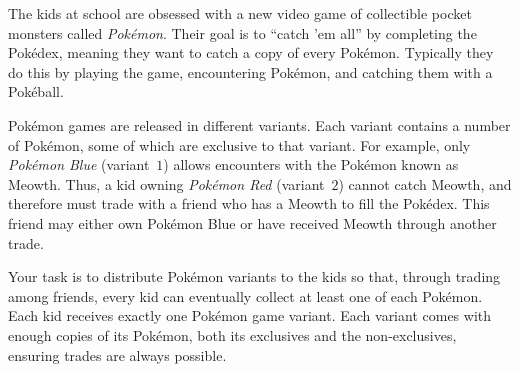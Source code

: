

The kids at school are obsessed with a new video game of collectible pocket monsters called \emph{Pokémon}.
Their goal is to ``catch 'em all'' by completing the Pokédex, meaning they want to catch a copy of every Pokémon.
Typically they do this by playing the game, encountering Pokémon, and catching them with a Pokéball.

Pokémon games are released in different variants.
Each variant contains a number of Pokémon, some of which are exclusive to that variant.
For example, only \emph{Pokémon Blue} (variant~$1$) allows encounters with the Pokémon known as Meowth.
Thus, a kid owning \emph{Pokémon Red} (variant~$2$) cannot catch Meowth, and therefore must trade with a friend who has a Meowth to fill the Pokédex.
This friend may either own Pokémon Blue or have received Meowth through another trade.

Your task is to distribute Pokémon variants to the kids so that, through trading among friends,
every kid can eventually collect at least one of each Pokémon.
Each kid receives exactly one Pokémon game variant.
Each variant comes with enough copies of its Pokémon, both its exclusives and the non-exclusives, ensuring trades are always possible.

